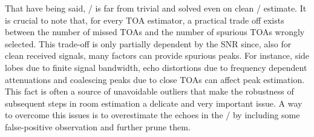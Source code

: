 \mynewline
That have being said, \AER/ is far from trivial and solved even on clean \RIR/ estimate.
It is crucial to note that, for every TOA estimator, a practical trade off exists between the number of missed TOAs and the number of spurious TOAs wrongly selected.
This trade-off is only partially dependent by the SNR since, also for clean received signals, many factors can provide spurious peaks.
For instance, side lobes due to finite signal bandwidth, echo distortions due to frequency dependent attenuations and coalescing peaks due to close TOAs can affect peak estimation.
This fact is often a source of unavoidable outliers that make the robustness of subsequent steps in room estimation a delicate and very important issue.
A way to overcome this issues is to overestimate the echoes in the \RIR/ by including some false-positive observation and further prune them.

